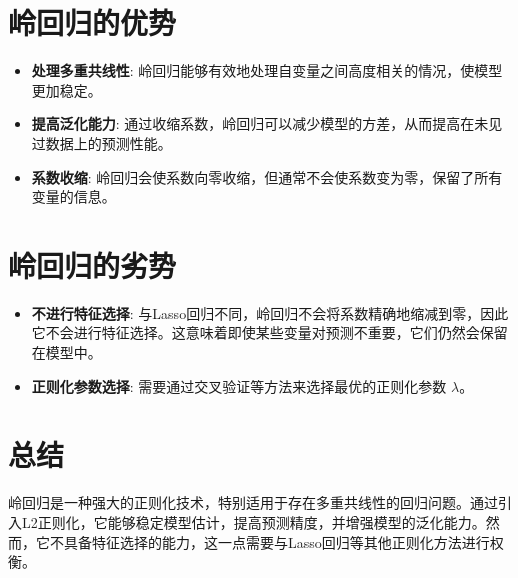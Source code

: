 \section{岭回归的优势}
\begin{itemize}
    \item \textbf{处理多重共线性}: 岭回归能够有效地处理自变量之间高度相关的情况，使模型更加稳定。
    \item \textbf{提高泛化能力}: 通过收缩系数，岭回归可以减少模型的方差，从而提高在未见过数据上的预测性能。
    \item \textbf{系数收缩}: 岭回归会使系数向零收缩，但通常不会使系数变为零，保留了所有变量的信息。
\end{itemize}

\section{岭回归的劣势}
\begin{itemize}
    \item \textbf{不进行特征选择}: 与Lasso回归不同，岭回归不会将系数精确地缩减到零，因此它不会进行特征选择。这意味着即使某些变量对预测不重要，它们仍然会保留在模型中。
    \item \textbf{正则化参数选择}: 需要通过交叉验证等方法来选择最优的正则化参数 $\lambda$。
\end{itemize}

\section{总结}
岭回归是一种强大的正则化技术，特别适用于存在多重共线性的回归问题。通过引入L2正则化，它能够稳定模型估计，提高预测精度，并增强模型的泛化能力。然而，它不具备特征选择的能力，这一点需要与Lasso回归等其他正则化方法进行权衡。

